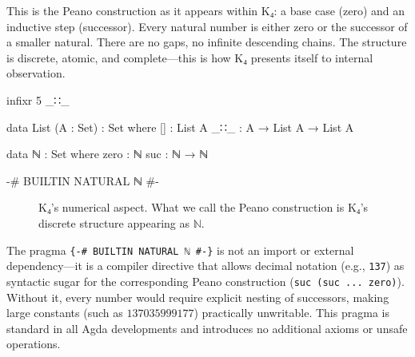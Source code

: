 \documentclass[11pt,a4paper]{book}
\begin{document}
This is the Peano construction as it appears within K₄: a base case (zero) and an inductive step (successor).
Every natural number is either zero or the successor of a smaller natural. There are
no gaps, no infinite descending chains. The structure is discrete, atomic, and complete—this is how K₄ presents itself to internal observation.

\begin{code}
infixr 5 _∷_


data List (A : Set) : Set where
  []  : List A
  _∷_ : A → List A → List A

data ℕ : Set where
  zero : ℕ
  suc  : ℕ → ℕ

{-# BUILTIN NATURAL ℕ #-}
\end{code}

\begin{figure}[h]
\centering
{}
\caption{K₄'s numerical aspect. What we call the Peano construction is K₄'s discrete structure appearing as $\mathbb{N}$.}
\label{fig:peano-emergence}
\end{figure}

The pragma \texttt{\{-\# BUILTIN NATURAL ℕ \#-\}} is not an import or external dependency—it
is a compiler directive that allows decimal notation (e.g., \texttt{137}) as syntactic sugar
for the corresponding Peano construction (\texttt{suc (suc ... zero)}). Without it, every
number would require explicit nesting of successors, making large constants (such as
$137035999177$) practically unwritable. This pragma is standard in all Agda developments
and introduces no additional axioms or unsafe operations.
\end{document}
